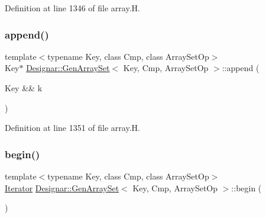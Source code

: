Definition at line 1346 of file array.\+H.

\mbox{\label{class_designar_1_1_gen_array_set_aafb9d33d1a9a6f5b07d434705290b7bc}} 
\subsubsection{\texorpdfstring{append()}{append()}\hspace{0.1cm}{\footnotesize\ttfamily [2/2]}}
{\footnotesize\ttfamily template$<$typename Key, class Cmp, class Array\+Set\+Op$>$ \\
Key$\ast$ \hyperlink{class_designar_1_1_gen_array_set}{Designar\+::\+Gen\+Array\+Set}$<$ Key, Cmp, Array\+Set\+Op $>$\+::append (\begin{DoxyParamCaption}\item[{Key \&\&}]{k }\end{DoxyParamCaption})\hspace{0.3cm}{\ttfamily [inline]}}



Definition at line 1351 of file array.\+H.

\mbox{\label{class_designar_1_1_gen_array_set_af736c7af596752d636881374f0d45f4c}} 
\subsubsection{\texorpdfstring{begin()}{begin()}\hspace{0.1cm}{\footnotesize\ttfamily [1/2]}}
{\footnotesize\ttfamily template$<$typename Key, class Cmp, class Array\+Set\+Op$>$ \\
\hyperlink{class_designar_1_1_gen_array_set_1_1_iterator}{Iterator} \hyperlink{class_designar_1_1_gen_array_set}{Designar\+::\+Gen\+Array\+Set}$<$ Key, Cmp, Array\+Set\+Op $>$\+::begin (\begin{DoxyParamCaption}{ }\end{DoxyParamCaption})\hspace{0.3cm}{\ttfamily [inline]}}



